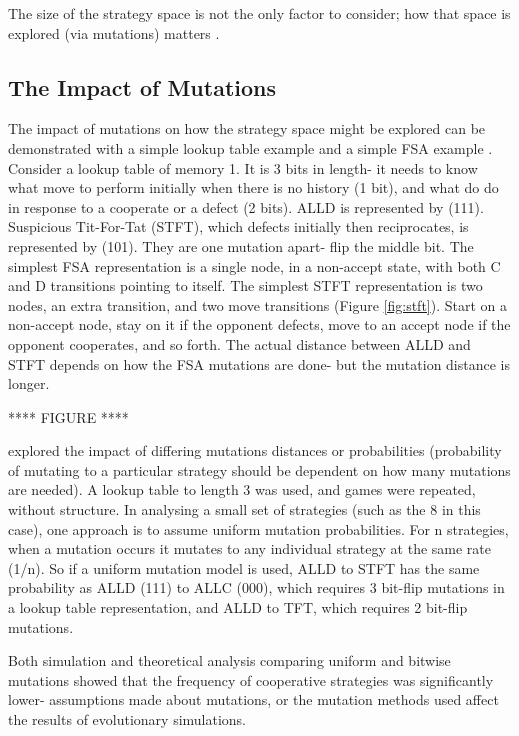 \documentclass[a4paper,11pt,bcshonoursthesis,singlespace,twoside]{cssethesis}
\begin{document}
The size of the strategy space is not the only factor to consider; how that space is explored (via mutations) matters \citep{garcia:PLoSOne:2012}.

\subsection{The Impact of Mutations}
The impact of mutations on how the strategy space might be explored can be demonstrated with a simple lookup table example and a simple FSA example \citep{fogel1993evolving, garcia:PLoSOne:2012}.  
Consider a lookup table of memory 1. It is 3 bits in length- it needs to know what move to perform initially when there is no history (1 bit), and what do do in response to a cooperate or a defect (2 bits). 
ALLD is represented by (111). Suspicious Tit-For-Tat (STFT), which defects initially then reciprocates, is represented by (101). They are one mutation apart- flip the middle bit. 
The simplest FSA representation is a single node, in a non-accept state, with both C and D transitions pointing to itself. The simplest STFT representation is two nodes, an extra transition, and two move transitions (Figure \ref{fig:stft}). Start on a non-accept node, stay on it if the opponent defects, move to an accept node if the opponent cooperates, and so forth. 
The actual distance between ALLD and STFT depends on how the FSA mutations are done- but the mutation distance is longer. 

**** FIGURE ****


\citet{garcia:PLoSOne:2012} explored the impact of differing mutations distances or probabilities (probability of mutating to a particular strategy should be dependent on how many mutations are needed). 
A lookup table to length 3 was used, and games were repeated, without structure. 
In analysing a small set of strategies (such as the 8 in this case), one approach is to assume uniform mutation probabilities. For n strategies, when a mutation occurs it mutates to any individual strategy at the same rate (1/n). So if a uniform mutation model is used, ALLD to STFT has the same probability as ALLD (111) to ALLC (000), which requires 3 bit-flip mutations in a lookup table representation, and ALLD to TFT, which requires 2 bit-flip mutations.

Both simulation and theoretical analysis comparing uniform and bitwise mutations showed that the frequency of cooperative strategies was significantly lower- assumptions made about mutations, or the mutation methods used affect the results of evolutionary simulations. 
\end{document}
